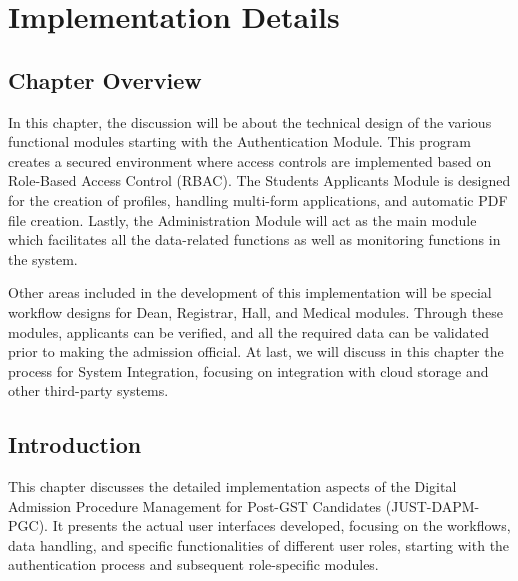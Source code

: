 \chapter{Implementation Details}
\label{ch:implementation}

\section{Chapter Overview}

In this chapter, the discussion will be about the technical design of the various functional modules starting with the Authentication Module. This program creates a secured environment where access controls are implemented based on Role-Based Access Control (RBAC). The Students  Applicants Module is designed for the creation of profiles, handling multi-form applications, and automatic PDF file creation. Lastly, the Administration Module will act as the main module which facilitates all the data-related functions as well as monitoring functions in the system.

\noindent Other areas included in the development of this implementation will be special workflow designs for Dean, Registrar, Hall, and Medical modules. Through these modules, applicants can be verified, and all the required data can be validated prior to making the admission official. At last, we will discuss in this chapter the process for System Integration, focusing on integration with cloud storage and other third-party systems.

\section{Introduction}

This chapter discusses the detailed implementation aspects of the Digital Admission Procedure Management for Post-GST Candidates (JUST-DAPM-PGC). It presents the actual user interfaces developed, focusing on the workflows, data handling, and specific functionalities of different user roles, starting with the authentication process and subsequent role-specific modules.












